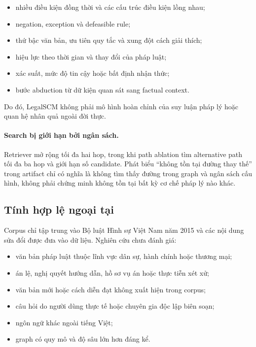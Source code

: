 \begin{itemize}
    \item nhiều điều kiện đồng thời và các cấu trúc điều kiện lồng nhau;
    \item negation, exception và defeasible rule;
    \item thứ bậc văn bản, ưu tiên quy tắc và xung đột cách giải thích;
    \item hiệu lực theo thời gian và thay đổi của pháp luật;
    \item xác suất, mức độ tin cậy hoặc bất định nhận thức;
    \item bước abduction từ dữ kiện quan sát sang factual context.
\end{itemize}

Do đó, LegalSCM không phải mô hình hoàn chỉnh của suy luận pháp lý hoặc quan
hệ nhân quả ngoài đời thực.

\paragraph{Search bị giới hạn bởi ngân sách.}

Retriever mở rộng tối đa hai hop, trong khi path ablation tìm alternative
path tối đa ba hop và giới hạn số candidate. Phát biểu ``không tồn tại đường
thay thế'' trong artifact chỉ có nghĩa là không tìm thấy đường trong graph
và ngân sách cấu hình, không phải chứng minh không tồn tại bất kỳ cơ chế
pháp lý nào khác.

\subsection{Tính hợp lệ ngoại tại}

Corpus chỉ tập trung vào Bộ luật Hình sự Việt Nam năm 2015 và các nội dung
sửa đổi được đưa vào dữ liệu. Nghiên cứu chưa đánh giá:

\begin{itemize}
    \item văn bản pháp luật thuộc lĩnh vực dân sự, hành chính hoặc thương mại;
    \item án lệ, nghị quyết hướng dẫn, hồ sơ vụ án hoặc thực tiễn xét xử;
    \item văn bản mới hoặc cách diễn đạt không xuất hiện trong corpus;
    \item câu hỏi do người dùng thực tế hoặc chuyên gia độc lập biên soạn;
    \item ngôn ngữ khác ngoài tiếng Việt;
    \item graph có quy mô và độ sâu lớn hơn đáng kể.
\end{itemize}

